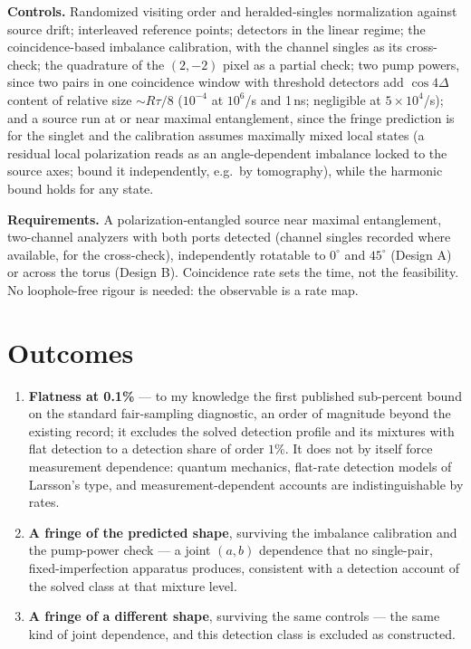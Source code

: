 \documentclass[10pt]{article}
\begin{document}
\textbf{Controls.} Randomized visiting order and heralded-singles normalization against source drift; interleaved reference points; detectors in the linear regime; the coincidence-based imbalance calibration, with the channel singles as its cross-check; the quadrature of the $(2,-2)$ pixel as a partial check; two pump powers, since two pairs in one coincidence window with threshold detectors add $\cos 4\Delta$ content of relative size $\sim R\tau/8$ ($10^{-4}$ at $10^6$/s and 1\,ns; negligible at $5\times10^4$/s); and a source run at or near maximal entanglement, since the fringe prediction is for the singlet and the calibration assumes maximally mixed local states (a residual local polarization reads as an angle-dependent imbalance locked to the source axes; bound it independently, e.g.\ by tomography), while the harmonic bound holds for any state.

\textbf{Requirements.} A polarization-entangled source near maximal entanglement, two-channel analyzers with both ports detected (channel singles recorded where available, for the cross-check), independently rotatable to $0^\circ$ and $45^\circ$ (Design A) or across the torus (Design B). Coincidence rate sets the time, not the feasibility. No loophole-free rigour is needed: the observable is a rate map.

\section*{Outcomes}
\begin{enumerate}[nosep]
\item \textbf{Flatness at 0.1\%} --- to my knowledge the first published sub-percent bound on the standard fair-sampling diagnostic, an order of magnitude beyond the existing record; it excludes the solved detection profile and its mixtures with flat detection to a detection share of order $1\%$. It does not by itself force measurement dependence: quantum mechanics, flat-rate detection models of Larsson's type, and measurement-dependent accounts are indistinguishable by rates.
\item \textbf{A fringe of the predicted shape}, surviving the imbalance calibration and the pump-power check --- a joint $(a,b)$ dependence that no single-pair, fixed-imperfection apparatus produces, consistent with a detection account of the solved class at that mixture level.
\item \textbf{A fringe of a different shape}, surviving the same controls --- the same kind of joint dependence, and this detection class is excluded as constructed.
\end{enumerate}
\end{document}
